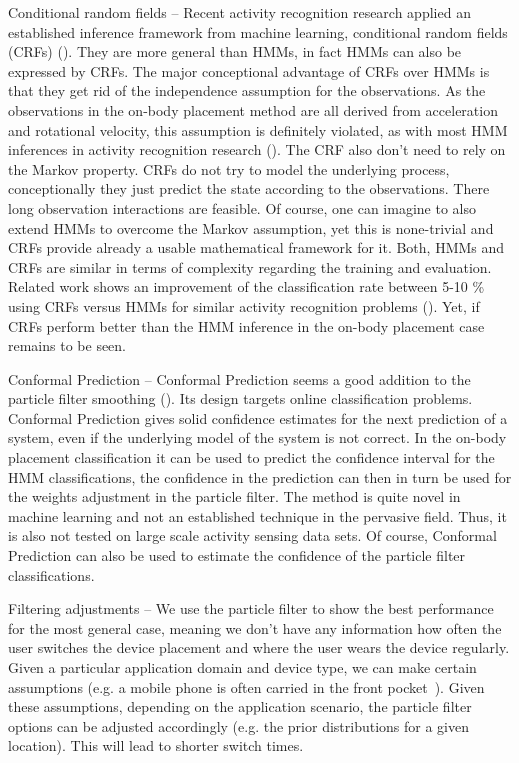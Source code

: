 \begin{description}
\item{Conditional random fields} -- Recent activity recognition research 
applied an established inference framework from machine learning, conditional random fields (CRFs)
(\cite{Lafferty:2001:CRF:645530.655813,Vail:2007:CRF:1329125.1329409}).
They are more general than HMMs, in fact HMMs can also be expressed 
by CRFs. The major conceptional advantage of CRFs over HMMs is that they get rid of the 
independence assumption for the observations. As the observations
in the on-body placement method are all derived from acceleration and rotational 
velocity, this assumption is definitely violated, as with most HMM inferences in 
activity recognition research (\cite{790429,10.1109/ISWC.2005.22}). The CRF also don't need to rely on 
the Markov property. CRFs do not try to model the underlying process, conceptionally
they just predict the state according to the observations. There long  
observation interactions are feasible. Of course, one can imagine to also extend HMMs 
to overcome the Markov assumption, yet this is none-trivial and 
CRFs provide already a usable mathematical framework for it. Both, HMMs and CRFs are
similar in terms of complexity regarding the training and evaluation. 
Related work shows an improvement of the classification rate between 5-10 \%
using CRFs versus HMMs for similar activity recognition problems (\cite{Vail:2007:CRF:1329125.1329409}). 
Yet, if CRFs perform better than the HMM inference in the on-body placement case remains to be seen.
\item{Conformal Prediction} -- Conformal Prediction seems 
a good addition to the particle filter smoothing (\cite{Shafer:2008:TCP:1390681.1390693}). 
Its design targets online classification problems. 
Conformal Prediction gives solid confidence estimates for the next prediction of a system, even if the underlying
model of the system is not correct. In the on-body placement classification it can be used
to predict the confidence interval for the HMM classifications, the confidence in the prediction
can then in turn be used for the weights adjustment in the particle filter.
The method is quite novel in machine learning and not an established technique in the pervasive field.
Thus, it is also not tested on large scale activity sensing data sets.
Of course, Conformal Prediction can also be used to estimate the confidence of
the particle filter classifications. 
\item{Filtering adjustments} -- We use the particle filter to show the
best performance for the most general case, meaning we don't have any information
how often the user switches the device placement and where the user wears the
device regularly. Given a particular application domain and device type,
we can make certain assumptions (e.g. a mobile phone is often carried
 in the front pocket~\cite{Ichikawa:2005p6295}). 
Given these assumptions, depending on the application
scenario, the particle filter options can be adjusted 
accordingly (e.g. the prior distributions for a given location). 
This will lead to shorter switch times.
\end{description}

